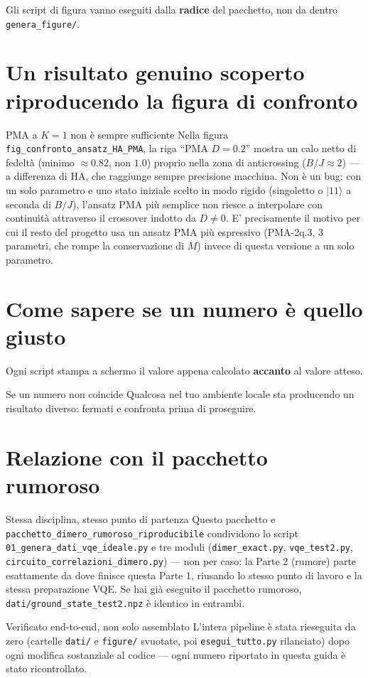 \documentclass[11pt,a4paper]{article}
\newcommand{\ket}[1]{\lvert #1 \rangle}
\newcommand{\code}[1]{\texttt{\small #1}}
\begin{document}
Gli script di figura vanno eseguiti dalla \textbf{radice} del pacchetto,
non da dentro \code{genera\_figure/}.

\section{Un risultato genuino scoperto riproducendo la figura di confronto}

\begin{warnbox}{PMA a $K=1$ non è sempre sufficiente}
Nella figura \code{fig\_confronto\_ansatz\_HA\_PMA}, la riga ``PMA
$D=0.2$'' mostra un calo netto di fedeltà (minimo $\approx0.82$, non
$1.0$) proprio nella zona di anticrossing ($B/J\approx2$) --- a
differenza di HA, che raggiunge sempre precisione macchina. Non è un
bug: con un solo parametro e uno stato iniziale scelto in modo rigido
(singoletto o $\ket{11}$ a seconda di $B/J$), l'ansatz PMA più semplice
non riesce a interpolare con continuità attraverso il crossover indotto
da $D\neq0$. E' precisamente il motivo per cui il resto del progetto usa
un ansatz PMA più espressivo (PMA-2q.3, 3 parametri, che rompe la
conservazione di $M$) invece di questa versione a un solo parametro.
\end{warnbox}

\section{Come sapere se un numero è quello giusto}

Ogni script stampa a schermo il valore appena calcolato \textbf{accanto}
al valore atteso.

\begin{warnbox}{Se un numero non coincide}
Qualcosa nel tuo ambiente locale sta producendo un risultato diverso:
fermati e confronta prima di proseguire.
\end{warnbox}

\section{Relazione con il pacchetto rumoroso}

\begin{okbox}{Stessa disciplina, stesso punto di partenza}
Questo pacchetto e \code{pacchetto\_dimero\_rumoroso\_riproducibile}
condividono lo script \code{01\_genera\_dati\_vqe\_ideale.py} e tre
moduli (\code{dimer\_exact.py}, \code{vqe\_test2.py},
\code{circuito\_correlazioni\_dimero.py}) --- non per caso: la Parte 2
(rumore) parte esattamente da dove finisce questa Parte 1, riusando lo
stesso punto di lavoro e la stessa preparazione VQE. Se hai già
eseguito il pacchetto rumoroso, \code{dati/ground\_state\_test2.npz} è
identico in entrambi.
\end{okbox}

\begin{okbox}{Verificato end-to-end, non solo assemblato}
L'intera pipeline è stata rieseguita da zero (cartelle \code{dati/} e
\code{figure/} svuotate, poi \code{esegui\_tutto.py} rilanciato) dopo
ogni modifica sostanziale al codice --- ogni numero riportato in questa
guida è stato ricontrollato.
\end{okbox}
\end{document}

